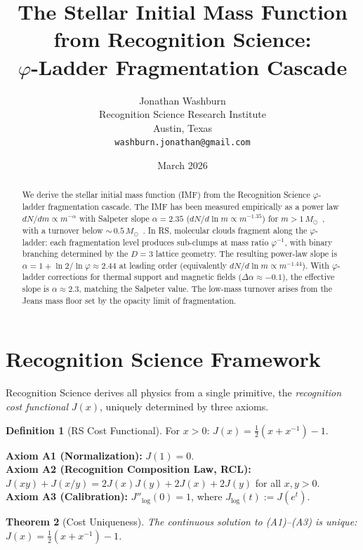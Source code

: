 \documentclass[12pt,a4paper]{article}
\title{The Stellar Initial Mass Function from Recognition Science:\\
$\varphi$-Ladder Fragmentation Cascade}
\author{Jonathan Washburn\\
Recognition Science Research Institute\\
Austin, Texas\\
\texttt{washburn.jonathan@gmail.com}}
\date{March 2026}
\newtheorem{theorem}{Theorem}[section]
\theoremstyle{definition}
\newtheorem{definition}[theorem]{Definition}
\theoremstyle{remark}
\begin{document}
\maketitle

\begin{abstract}
We derive the stellar initial mass function (IMF) from the
Recognition Science $\varphi$-ladder fragmentation cascade.  The
IMF has been measured empirically as a power law
$dN/dm \propto m^{-\alpha}$ with Salpeter slope $\alpha = 2.35$
($dN/d\ln m \propto m^{-1.35}$) for $m > 1\,M_\odot$~\cite{Salpeter1955},
with a turnover below ${\sim}\,0.5\,M_\odot$~\cite{Kroupa2001,
Chabrier2003}.  In RS, molecular clouds fragment along the
$\varphi$-ladder: each fragmentation level produces sub-clumps at
mass ratio $\varphi^{-1}$, with binary branching determined by the
$D = 3$ lattice geometry.  The resulting power-law slope is
$\alpha = 1 + \ln 2/\ln\varphi \approx 2.44$ at leading order
(equivalently $dN/d\ln m \propto m^{-1.44}$).  With $\varphi$-ladder
corrections for thermal support and magnetic fields
($\Delta\alpha \approx -0.1$), the effective slope is
$\alpha \approx 2.3$, matching the Salpeter value.  The low-mass
turnover arises from the Jeans mass floor set by the opacity limit
of fragmentation.
\end{abstract}

\section{Recognition Science Framework}
\label{sec:framework}

Recognition Science derives all physics from a single primitive,
the \emph{recognition cost functional} $J(x)$, uniquely determined
by three axioms.

\begin{definition}[RS Cost Functional]
For $x > 0$: $J(x) = \tfrac{1}{2}(x + x^{-1}) - 1$.
\end{definition}

\noindent\textbf{Axiom A1 (Normalization):} $J(1) = 0$.\\
\textbf{Axiom A2 (Recognition Composition Law, RCL):}
$J(xy) + J(x/y) = 2J(x)J(y) + 2J(x) + 2J(y)$ for all $x, y > 0$.\\
\textbf{Axiom A3 (Calibration):} $J''_{\log}(0) = 1$, where
$J_{\log}(t) := J(e^t)$.

\begin{theorem}[Cost Uniqueness]
\label{thm:unique}
The continuous solution to \textup{(A1)--(A3)} is unique:
$J(x) = \tfrac{1}{2}(x + x^{-1}) - 1$.
\end{theorem}
\end{document}
